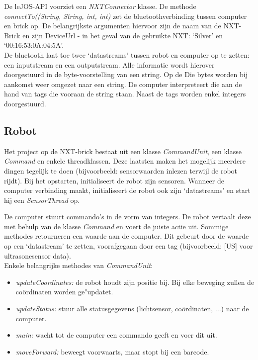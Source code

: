 \documentclass[eind]{penoverslag}
\begin{document}
De leJOS-API \cite{leJOS} voorziet een \textit{NXTConnector} klasse. De methode \textit{connectTo((String, String, int, int)} zet de bluetoothverbinding tussen computer en brick op. De belangrijkste argumenten hiervoor zijn de naam van de NXT-Brick en zijn DeviceUrl  - in het geval van de gebruikte NXT: `Silver' en `00:16:53:0A:04:5A'.\\

De bluetooth laat toe twee `datastreams' tussen robot en computer op te zetten: een inputstream en een outputstream. Alle informatie wordt hierover doorgestuurd in de byte-voorstelling van een string. Op de Die bytes worden bij aankomst weer omgezet naar een string. De computer interpreteert die aan de hand van tags die vooraan de string staan. Naast de tags worden enkel integers doorgestuurd.

\subsection{Robot} %
\label{ssec:robot}
Het project op de NXT-brick bestaat uit een klasse \textit{CommandUnit}, een klasse \textit{Command} en enkele threadklassen. Deze laatsten maken het mogelijk meerdere dingen tegelijk te doen (bijvoorbeeld: sensorwaarden inlezen terwijl de robot rijdt). Bij het opstarten, initialiseert de robot zijn sensoren. Wanneer de computer verbinding maakt, initialiseert de robot ook zijn `datastreams' en start hij een \textit{SensorThread} op.

De computer stuurt commando's in de vorm van integers. De robot vertaalt deze met behulp van de klasse \textit{Command} en voert de juiste actie uit. Sommige methodes retourneren een waarde aan de computer. Dit gebeurt door de waarde op een `datastream' te zetten, voorafgegaan door een tag (bijvoorbeeld: [US] voor ultrasonesensor data).\\

Enkele belangrijke methodes van \textit{CommandUnit}:
\begin{itemize}
\item \textit{updateCoordinates:} de robot houdt zijn positie bij. Bij elke beweging zullen de co\"ordinaten worden ge"updatet.
\item \textit{updateStatus:} stuur alle statusgegevens (lichtsensor, co\"ordinaten, ...) naar de computer.
\item \textit{main:} wacht tot de computer een commando geeft en voer dit uit.
\item \textit{moveForward:} beweegt voorwaarts, maar stopt bij een barcode.
\end{itemize}
\end{document}
